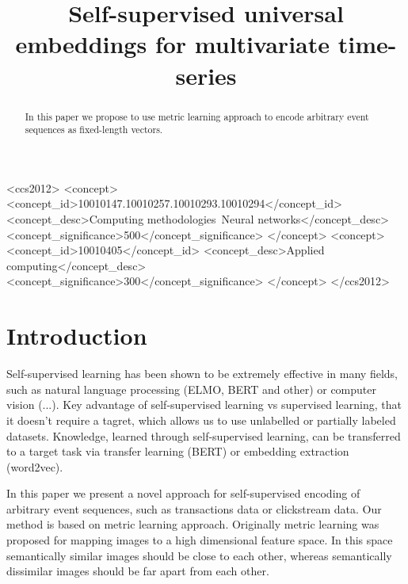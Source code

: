 \documentclass[sigconf]{acmart}
\begin{document}
\title{Self-supervised universal embeddings for multivariate time-series}


\begin{abstract}

In this paper we propose to use metric learning approach to encode arbitrary event sequences as fixed-length vectors.

\end{abstract}

\begin{CCSXML}
<ccs2012>
<concept>
<concept_id>10010147.10010257.10010293.10010294</concept_id>
<concept_desc>Computing methodologies~Neural networks</concept_desc>
<concept_significance>500</concept_significance>
</concept>
<concept>
<concept_id>10010405</concept_id>
<concept_desc>Applied computing</concept_desc>
<concept_significance>300</concept_significance>
</concept>
</ccs2012>
\end{CCSXML}



\maketitle

\section{Introduction}

Self-supervised learning has been shown to be extremely effective in many fields, such as natural language processing (ELMO, BERT and other) or computer vision (...). Key advantage of self-supervised learning vs supervised learning, that it doesn't require a tagret, which allows us to use unlabelled or partially labeled datasets. Knowledge, learned through self-supervised learning, can be transferred to a target task via transfer learning (BERT) or embedding extraction (word2vec).

In this paper we present a novel approach for self-supervised encoding of arbitrary event sequences, such as transactions data or clickstream data. Our method is based on metric learning approach. Originally metric learning was proposed for mapping images to a high dimensional feature space. In this space semantically similar images should be close to each other, whereas semantically dissimilar images should be far apart from each other.
\end{document}
